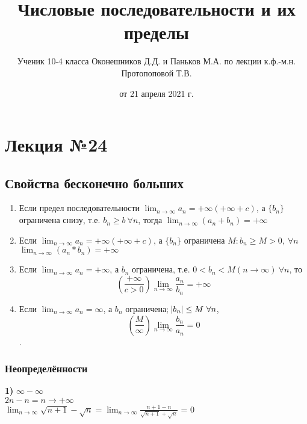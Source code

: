 \documentclass{article}
\begin{document}
    \title{Числовые последовательности и их пределы}
    \author{Ученик 10-4 класса Оконешников Д.Д. и Паньков М.А. по лекции к.ф.-м.н. Протопоповой Т.В.}
    \date{от 21 апреля 2021 г.}
    \maketitle

    \section{Лекция №24}
    \subsection{Свойства бесконечно больших}

    \begin{enumerate}
        \item Если предел последовательности \( \lim_{n \rightarrow \infty }a_n = + \infty \)\( (+\infty + c) \), а \( \{b_n\} \) ограничена снизу, т.е. \( b_n \geq b\ \forall n \), тогда \(\lim_{n \rightarrow \infty}{(a_n + b_n)} = +\infty\)
       
        \item Если \( \lim_{n \rightarrow \infty }a_n = + \infty \)\( (+\infty + c) \), а \( \{b_n\} \) ограничена \( M: b_n \geq M > 0,\ \forall n \)
    \(\lim_{n \rightarrow \infty}{(a_n * b_n)} = +\infty\)

        \item Если \( \lim_{n \rightarrow \infty }a_n = +\infty \), а \( b_n \) ограничена, т.е. \( 0 < b_n < M (n \rightarrow \infty)\ \forall n \), то \[ (\frac{+\infty}{c > 0}) \lim_{n \rightarrow \infty}{\frac{a_n}{b_n}} = +\infty\]
    
        \item Если \(\lim_{n \rightarrow \infty}{a_n} = \infty\), а \(b_n\) ограничена; \(\abs{b_n} \leq M\  \forall n\), \[ (\frac{M}{\infty}) \lim_{n \rightarrow \infty }\frac{b_n}{a_n} = 0 \].
    \end{enumerate}

    \subsubsection{Неопределённости}

    \textbf{1)} \(\infty - \infty\)
    \\ \(2n - n = n \rightarrow +\infty\)
    \\ \(\lim_{n \rightarrow \infty}{\sqrt{n+1} - \sqrt{n}} = \lim_{n \rightarrow \infty}{\frac{n+1-n}{\sqrt{n+1}+\sqrt{n}}}\) = 0
\end{document}
